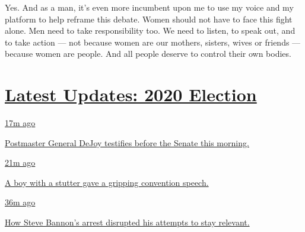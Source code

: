 Yes. And as a man, it's even more incumbent upon me to use my voice and
my platform to help reframe this debate. Women should not have to face
this fight alone. Men need to take responsibility too. We need to
listen, to speak out, and to take action --- not because women are our
mothers, sisters, wives or friends --- because women are people. And all
people deserve to control their own bodies.

\hypertarget{latest-updates-2020-election}{%
\section{\texorpdfstring{\href{https://www.nytimes3xbfgragh.onion/live/2020/08/21/us/dnc-convention-election?action=click\&pgtype=Article\&state=default\&region=MAIN_CONTENT_1\&context=storylines_live_updates}{Latest
Updates: 2020
Election}}{Latest Updates: 2020 Election}}\label{latest-updates-2020-election}}

\href{https://www.nytimes3xbfgragh.onion/live/2020/08/21/us/dnc-convention-election?action=click\&pgtype=Article\&state=default\&region=MAIN_CONTENT_1\&context=storylines_live_updates\#postmaster-general-dejoy-testifies-before-the-senate-this-morning}{17m
ago}

\href{https://www.nytimes3xbfgragh.onion/live/2020/08/21/us/dnc-convention-election?action=click\&pgtype=Article\&state=default\&region=MAIN_CONTENT_1\&context=storylines_live_updates\#postmaster-general-dejoy-testifies-before-the-senate-this-morning}{Postmaster
General DeJoy testifies before the Senate this morning.}

\href{https://www.nytimes3xbfgragh.onion/live/2020/08/21/us/dnc-convention-election?action=click\&pgtype=Article\&state=default\&region=MAIN_CONTENT_1\&context=storylines_live_updates\#a-boy-with-a-stutter-gave-a-gripping-convention-speech}{21m
ago}

\href{https://www.nytimes3xbfgragh.onion/live/2020/08/21/us/dnc-convention-election?action=click\&pgtype=Article\&state=default\&region=MAIN_CONTENT_1\&context=storylines_live_updates\#a-boy-with-a-stutter-gave-a-gripping-convention-speech}{A
boy with a stutter gave a gripping convention speech.}

\href{https://www.nytimes3xbfgragh.onion/live/2020/08/21/us/dnc-convention-election?action=click\&pgtype=Article\&state=default\&region=MAIN_CONTENT_1\&context=storylines_live_updates\#how-steve-bannons-arrest-disrupted-his-attempts-to-stay-relevant}{36m
ago}

\href{https://www.nytimes3xbfgragh.onion/live/2020/08/21/us/dnc-convention-election?action=click\&pgtype=Article\&state=default\&region=MAIN_CONTENT_1\&context=storylines_live_updates\#how-steve-bannons-arrest-disrupted-his-attempts-to-stay-relevant}{How
Steve Bannon's arrest disrupted his attempts to stay relevant.}

